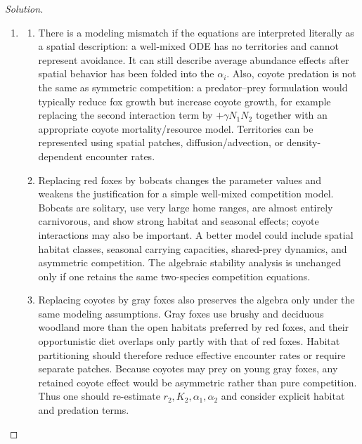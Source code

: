 \documentclass[12pt]{amsart}
\theoremstyle{conjecture}
\theoremstyle{definition}
\theoremstyle{question}
\theoremstyle{theorem}
\newenvironment{solution}
{\begin{proof}[Solution]}
{\end{proof}}
\begin{document}
\begin{enumerate}[leftmargin=2em]
\begin{solution}
\begin{enumerate}[label=(\alph*),leftmargin=2.2em]
          \item
          \begin{enumerate}[label=\roman*.,leftmargin=2em]
            \item There is a modeling mismatch if the equations are interpreted
            literally as a spatial description: a well-mixed ODE has no
            territories and cannot represent avoidance.  It can still describe
            average abundance effects after spatial behavior has been folded
            into the $\alpha_i$.  Also, coyote predation is not the same as
            symmetric competition: a predator--prey formulation would typically
            reduce fox growth but increase coyote growth, for example replacing
            the second interaction term by $+\gamma N_1N_2$ together with an
            appropriate coyote mortality/resource model.  Territories can be
            represented using spatial patches, diffusion/advection, or
            density-dependent encounter rates.

            \item Replacing red foxes by bobcats changes the parameter values and
            weakens the justification for a simple well-mixed competition model.
            Bobcats are solitary, use very large home ranges, are almost entirely
            carnivorous, and show strong habitat and seasonal effects; coyote
            interactions may also be important.  A better model could include
            spatial habitat classes, seasonal carrying capacities, shared-prey
            dynamics, and asymmetric competition.  The algebraic stability
            analysis is unchanged only if one retains the same two-species
            competition equations.

            \item Replacing coyotes by gray foxes also preserves the algebra only
            under the same modeling assumptions.  Gray foxes use brushy and
            deciduous woodland more than the open habitats preferred by red
            foxes, and their opportunistic diet overlaps only partly with that of
            red foxes.  Habitat partitioning should therefore reduce effective
            encounter rates or require separate patches.  Because coyotes may
            prey on young gray foxes, any retained coyote effect would be
            asymmetric rather than pure competition.  Thus one should
            re-estimate $r_2,K_2,\alpha_1,\alpha_2$ and consider explicit habitat
            and predation terms.
          \end{enumerate}
          \end{enumerate}
      \end{solution}
    \end{enumerate}
\end{document}
